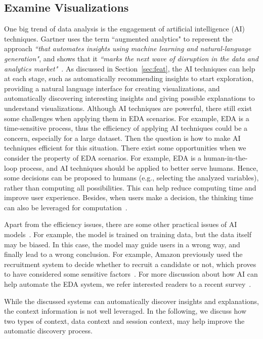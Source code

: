 \documentclass[11pt]{article}
\newcommand{\stitle}[1]{ \noindent{\bf #1.\xspace}}
\begin{document}
\subsection{Examine Visualizations}

\stitle{Augmented Analytics} One big trend of data analysis is the engagement of artificial intelligence (AI) techniques. Gartner uses the term ``augmented analytics" to represent the approach \emph{``that automates insights using machine learning and natural-language generation"}, and shows that it \emph{``marks the next wave of disruption in the data and analytics market"}~\cite{sallam2017augmented}. As discussed in Section~\ref{sec:feat}, the AI techniques can help at each stage, such as automatically recommending insights to start exploration, providing a natural language interface for creating visualizations, and automatically discovering interesting insights and giving possible explanations to understand visualizations. Although AI techniques are powerful, there still exist some challenges when applying them in EDA scenarios. For example, EDA is a time-sensitive process, thus the efficiency of applying AI techniques could be a concern, especially for a large dataset. Then the question is how to make AI techniques efficient for this situation. There exist some opportunities when we consider the property of EDA scenarios. For example, EDA is a human-in-the-loop process, and AI techniques should be applied to better serve humans. Hence, some decisions can be proposed to humans (e.g., selecting the analyzed variables), rather than computing all possibilities. This can help reduce computing time and improve user experience. Besides, when users make a decision, the thinking time can also be leveraged for computation~\cite{DBLP:conf/sigmod/CrottyGZBK16}.

Apart from the efficiency issues, there are some other practical issues of AI models~\cite{poursabzi2021manipulating, kaur2020interpreting}. For example, the model is trained on training data, but the data itself may be biased. In this case, the model may guide users in a wrong way, and finally lead to a wrong conclusion. For example,  Amazon previously used the recruitment system to decide whether to recruit a candidate or not, which proves to have considered some sensitive factors~\cite{yan2020silva}. For more discussion about how AI can help automate the EDA system, we refer interested readers to a recent survey~\cite{DBLP:conf/sigmod/MiloS20}.


\stitle{Leverage context information} While the discussed systems can automatically discover insights and explanations, the context information is not well leveraged. In the following, we discuss how two types of context, data context and session context, may help improve the automatic discovery process.
\end{document}
